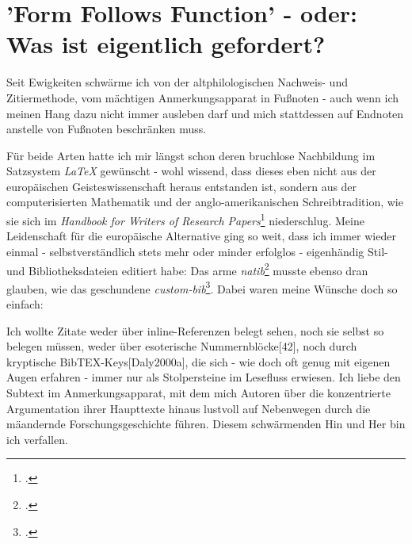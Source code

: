 %
%
%
%
\section{'Form Follows Function' - oder: Was ist eigentlich gefordert?}

Seit Ewigkeiten schwärme ich von der altphilologischen Nachweis- und
Zitiermethode, vom mächtigen Anmerkungsapparat in Fußnoten - auch wenn ich
meinen Hang dazu nicht immer ausleben darf und mich stattdessen auf Endnoten
anstelle von Fußnoten beschränken muss.

Für beide Arten hatte ich mir längst schon deren bruchlose Nachbildung im
Satzsystem \emph{LaTeX} gewünscht - wohl wissend, dass dieses eben nicht aus der
europäischen Geisteswissenschaft heraus entstanden ist, sondern aus der
computerisierten Mathematik und der anglo-amerikanischen Schreibtradition, wie
sie sich im \textit{Handbook for Writers of Research
Papers}\footcite[vgl.][]{ModLanAss2009a} niederschlug. Meine Leidenschaft für
die europäische Alternative ging so weit, dass ich immer wieder einmal -
selbstverständlich stets mehr oder minder erfolglos - eigenhändig Stil- und
Bibliotheksdateien editiert habe: Das arme
\emph{natib}\footcite[vgl.][]{Daly2000a} musste ebenso dran glauben, wie das
geschundene \emph{custom-bib}\footcite[vgl.][]{Daly2007a}. Dabei waren meine
Wünsche doch so einfach:

Ich wollte Zitate weder über inline-Referenzen belegt sehen, noch sie selbst so
belegen müssen, weder über esoterische Nummernblöcke[42], noch durch kryptische
BibTEX-Keys[Daly2000a], die sich - wie doch oft genug mit eigenen Augen erfahren
- immer nur als Stolpersteine im Lesefluss erwiesen. Ich liebe den Subtext im
Anmerkungsapparat, mit dem mich Autoren über die konzentrierte Argumentation
ihrer Haupttexte hinaus lustvoll auf Nebenwegen durch die mäandernde
Forschungsgeschichte führen. Diesem schwärmenden Hin und Her bin ich verfallen.

